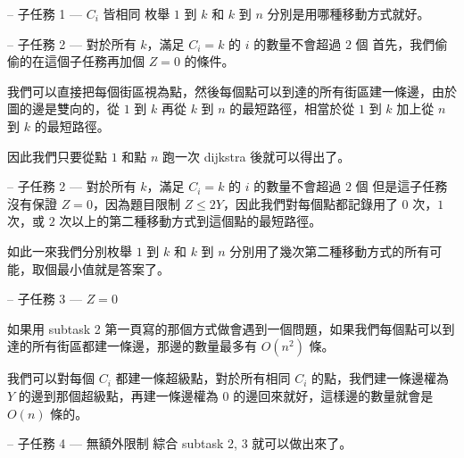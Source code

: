 \documentclass[hyperref,UTF8,notheorems,xcolor={dvipsnames}]{beamer}
\newcommand{\btitle}[1]{{\secname} -- #1}
\theoremstyle{definition}
\begin{document}
\begin{frame}[fragile]{\btitle{子任務 1 --- $C_i$ 皆相同}}
	枚舉 $1$ 到 $k$ 和 $k$ 到 $n$ 分別是用哪種移動方式就好。
\end{frame}

\begin{frame}[fragile]{\btitle{子任務 2 --- 對於所有 $k$，滿足 $C_i = k$ 的 $i$ 的數量不會超過 $2$ 個}}
	首先，我們偷偷的在這個子任務再加個 $Z = 0$ 的條件。

	我們可以直接把每個街區視為點，然後每個點可以到達的所有街區建一條邊，由於圖的邊是雙向的，從 $1$ 到 $k$ 再從 $k$ 到 $n$ 的最短路徑，相當於從 $1$ 到 $k$ 加上從 $n$ 到 $k$ 的最短路徑。
	
	因此我們只要從點 $1$ 和點 $n$ 跑一次 dijkstra 後就可以得出了。
\end{frame}

\begin{frame}[fragile]{\btitle{子任務 2 --- 對於所有 $k$，滿足 $C_i = k$ 的 $i$ 的數量不會超過 $2$ 個}}
	但是這子任務沒有保證 $Z = 0$，因為題目限制 $Z \le 2Y$，因此我們對每個點都記錄用了 $0$ 次，$1$ 次，或 $2$ 次以上的第二種移動方式到這個點的最短路徑。
	\pause
	
	如此一來我們分別枚舉 $1$ 到 $k$ 和 $k$ 到 $n$ 分別用了幾次第二種移動方式的所有可能，取個最小值就是答案了。
\end{frame}

\begin{frame}[fragile]{\btitle{子任務 3 --- $Z = 0$}}
	
	如果用 subtask 2 第一頁寫的那個方式做會遇到一個問題，如果我們每個點可以到達的所有街區都建一條邊，那邊的數量最多有 $O(n^2)$ 條。
	\pause

	我們可以對每個 $C_i$ 都建一條超級點，對於所有相同 $C_i$ 的點，我們建一條邊權為 $Y$ 的邊到那個超級點，再建一條邊權為 $0$ 的邊回來就好，這樣邊的數量就會是 $O(n)$ 條的。
	
\end{frame}

\begin{frame}[fragile]{\btitle{子任務 4 --- 無額外限制}}
	綜合 subtask 2, 3 就可以做出來了。
\end{frame}
\end{document}
